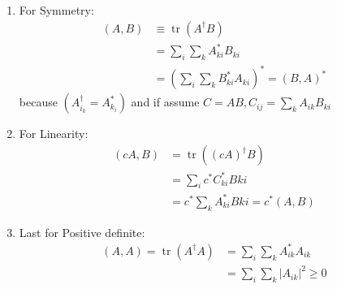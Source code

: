 \begin{enumerate}
    \item For Symmetry: 
    \begin{equation}
    \begin{aligned}
    (A, B) & \equiv \operatorname{tr}\left(A^{\dag} B\right) \\
    & =\sum_i \sum_k A_{ki}^* B_{ki} \\
    & =\left(\sum_i \sum_k B_{ki}^* A_{ki}\right)^* = (B, A)^* 
\end{aligned}
\end{equation}
because $(A_{i_k}^{\dag} = A_{k_i}^*) $ and if assume $ C=AB, C_{ij} = \sum_k A_{ik}B_{ki} $
    \item For Linearity: 
    \begin{equation}
\begin{aligned}
(c A, B) & =\operatorname{tr}\left((c A)^{\dag} B\right) \\
& =\sum_i c^* C_{k i}^* B k i \\
& =c^* \sum_k A_{k i}^* B k i=c^*(A, B)
\end{aligned}
\end{equation}
    \item Last for Positive definite:  
\begin{equation}
\begin{aligned}
(A, A)=\operatorname{tr}\left(A^{\dag} A\right) & =\sum_i \sum_k A_{ik}^{*} A_{ik} \\
& =\sum_i \sum_k |A_{ik}|^2 \geq 0
\end{aligned}
\end{equation}
\end{enumerate}

